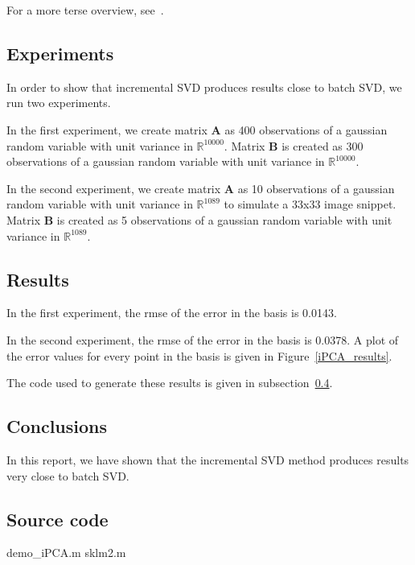 For a more terse overview, see~\cite{2008_JNL_subspaceTRK_Ross}.

\subsection{Experiments}

In order to show that incremental SVD produces results close to batch SVD, we run two experiments.

In the first experiment, we create matrix $\mathbf{A}$ as 400 observations of a gaussian random variable with unit variance in $\mathbb{R}^{10000}$.  Matrix $\mathbf{B}$ is created as 300 observations of a gaussian random variable with unit variance in $\mathbb{R}^{10000}$.  

In the second experiment, we create matrix $\mathbf{A}$ as 10 observations of a gaussian random variable with unit variance in $\mathbb{R}^{1089}$ to simulate a 33x33 image snippet.  Matrix $\mathbf{B}$ is created as 5 observations of a gaussian random variable with unit variance in $\mathbb{R}^{1089}$. 



\subsection{Results}

In the first experiment, the rmse of the error in the basis is 0.0143.

In the second experiment, the rmse of the error in the basis is 0.0378.  A plot of the error values for every point in the basis is given in Figure~\ref{iPCA_results}.

The code used to generate these results is given in subsection~\ref{Sec:sourceCode}.

\subsection{Conclusions}

In this report, we have shown that the incremental SVD method produces results very close to batch SVD.


\subsection{Source code}
\label{Sec:sourceCode}
\scriptsize
	{demo_iPCA.m}
		{sklm2.m}

\normalsize


